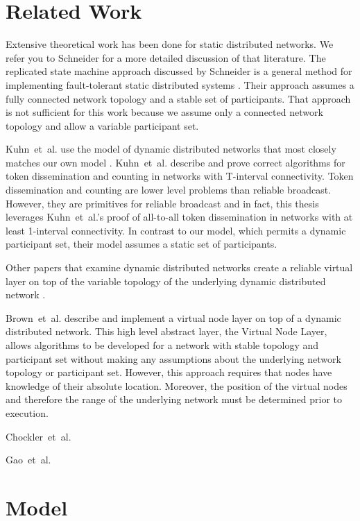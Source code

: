 \documentclass[english]{article}
\begin{document}
\section{Related Work}

Extensive theoretical work has been done for static distributed networks. We refer you to Schneider for a more detailed discussion of that literature. The replicated state machine approach discussed by Schneider is a general method for implementing fault-tolerant static distributed systems \cite{Schneider:1990}. Their approach assumes a fully connected network topology and a stable set of participants. That approach is not sufficient for this work because we assume only a connected network topology and allow a variable participant set. 

Kuhn~et~al. use the model of dynamic distributed networks that most closely matches our own model \cite{Kuhn:2008}. Kuhn~et~al. describe and prove correct algorithms for token dissemination and counting in networks with T-interval connectivity. Token dissemination and counting are lower level problems than reliable broadcast. However, they are primitives for reliable broadcast and in fact, this thesis leverages Kuhn~et~al.'s proof of all-to-all token dissemination in networks with at least 1-interval connectivity. In contrast to our model, which permits a dynamic participant set, their model assumes a static set of participants. 

Other papers that examine dynamic distributed networks create a reliable virtual layer on top of the variable topology of the underlying dynamic distributed network \cite{Brown:2007, Chockler:2008, Gao:2012}. 

Brown~et~al. describe and implement a virtual node layer on top of a dynamic distributed network. This high level abstract layer, the Virtual Node Layer, allows algorithms to be developed for a network with stable topology and participant set without making any assumptions about the underlying network topology or participant set. However, this approach requires that nodes have knowledge of their absolute location. Moreover, the position of the virtual nodes and therefore the range of the underlying network must be determined prior to execution.

Chockler~et~al.

Gao~et~al. 


\section{Model}
\end{document}
